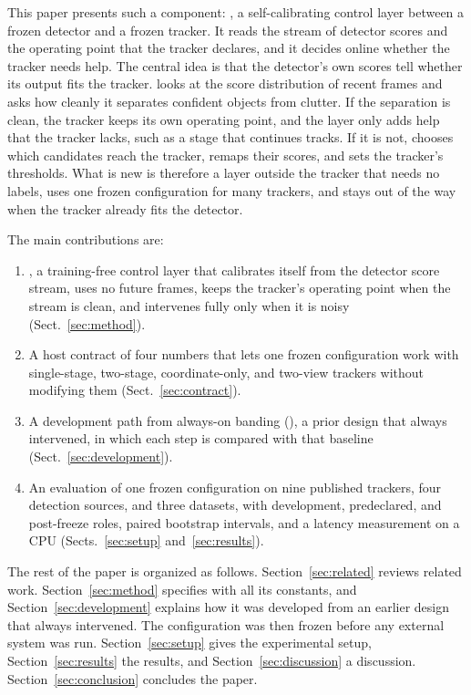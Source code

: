 This paper presents such a component: \scl{}, a self-calibrating control layer
between a frozen detector and a frozen tracker. It reads the stream of detector scores
and the operating point that the tracker declares, and it decides online
whether the tracker needs help. The central idea is that the detector's own
scores tell whether its output fits the tracker. \scl{} looks at the score
distribution of recent frames and asks how cleanly it separates confident
objects from clutter. If the separation is clean, the tracker keeps its own
operating point, and the layer only adds help that the tracker lacks, such as
a stage that continues tracks. If it is not, \scl{} chooses which candidates reach the
tracker, remaps their scores, and sets the tracker's thresholds. What is new
is therefore a layer outside the tracker that needs no labels, uses one frozen
configuration for many trackers, and stays out of the way when the tracker
already fits the detector.

The main contributions are:
\begin{enumerate}
\item \scl{}, a training-free control layer that calibrates itself from the detector
      score stream, uses no future frames, keeps the tracker's operating point
      when the stream is clean, and intervenes fully only when it is noisy
      (Sect.~\ref{sec:method}).
\item A host contract of four numbers that lets one frozen configuration work
      with single-stage, two-stage, coordinate-only, and two-view trackers
      without modifying them (Sect.~\ref{sec:contract}).
\item A development path from always-on banding (\aob{}), a prior design that
      always intervened, in which
      each step is compared with that baseline (Sect.~\ref{sec:development}).
\item An evaluation of one frozen configuration on nine published trackers,
      four detection sources, and three datasets, with development,
      predeclared, and post-freeze roles, paired bootstrap intervals, and a
      latency measurement on a CPU (Sects.~\ref{sec:setup}
      and~\ref{sec:results}).
\end{enumerate}

The rest of the paper is organized as follows. Section~\ref{sec:related}
reviews related work. Section~\ref{sec:method} specifies \scl{} with all its
constants, and Section~\ref{sec:development} explains how it was developed
from an earlier design that always intervened. The configuration was then
frozen before any external system was run.
Section~\ref{sec:setup} gives the experimental setup,
Section~\ref{sec:results} the results, and Section~\ref{sec:discussion} a
discussion. Section~\ref{sec:conclusion} concludes the paper.
